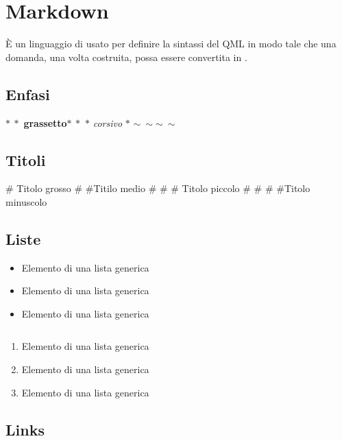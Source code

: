 \documentclass[12pt,a4paper]{article}
\begin{document}
\section{Markdown}\label{markdownGuide}

È un linguaggio di  usato per definire la sintassi del QML in modo tale che una domanda, una volta costruita, possa essere convertita in .

\subsection{Enfasi}

$\ast\ \ast$ \textbf{grassetto}$\ast\ \ast$
\newline
$\ast$ \textit{corsivo} $\ast$
\newline
$ \sim\ \sim$$ \sim\ \sim$

\subsection{Titoli}

\# {\Large Titolo grosso}
\newline
\# \#{\normalsize Titilo medio}
\newline
\# \# \# {\small Titolo piccolo}
\newline
\# \# \# \#{\tiny Titolo minuscolo}

\subsection{Liste}
\renewcommand{\labelitemi}{$\ast$}
\begin{itemize}
	\item Elemento di una lista generica
	\item Elemento di una lista generica
	\item Elemento di una lista generica
\end{itemize}
\begin{verbatim}

\end{verbatim}
\begin{enumerate}
	\item Elemento di una lista generica
	\item Elemento di una lista generica
	\item Elemento di una lista generica
\end{enumerate}

\subsection{Links}
\end{document}
